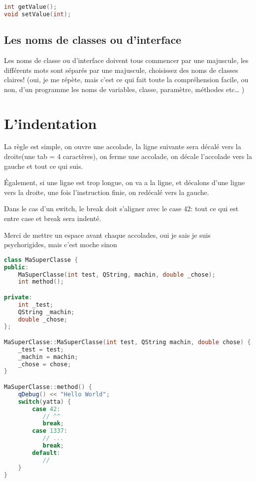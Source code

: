 \begin{lstlisting}[language=C++]
int getValue(); 
void setValue(int);
\end{lstlisting}

\subsection{Les noms de classes ou d'interface}\label{les-noms-de-classes-ou-dinterface}

Les noms de classe ou d'interface doivent tous commencer par une
majuscule, les différents mots sont séparés par une majuscule,
choisissez des noms de classes claires! (oui, je me répète, mais c'est
ce qui fait toute la compréhension facile, ou non, d'un programme les
noms de variables, classe, paramètre, méthodes etc\ldots{} )

\section{L'indentation}\label{lindentation}

La règle est simple, on ouvre une accolade, la ligne suivante sera
décalé vers la droite(une tab = 4 caractères), on ferme une accolade, on
décale l'accolade vers la gauche et tout ce qui suis.

Également, si une ligne est trop longue, on va a la ligne, et décalons
d'une ligne vers la droite, une fois l'instruction finie, on redécalé
vers la gauche.

Dans le cas d'un switch, le break doit s'aligner avec le case 42: tout
ce qui est entre case et break sera indenté.

Merci de mettre un espace avant chaque accolades, oui je sais je suis
psychorigides, mais c'est moche sinon

\begin{lstlisting}[language=C++]
class MaSuperClasse { 
public: 
	MaSuperClasse(int test, QString, machin, double _chose);
	int method();

private: 
	int _test;
	QString _machin;
	double _chose;
};

MaSuperClasse::MaSuperClasse(int test, QString machin, double chose) {
	_test = test;
	_machin = machin; 
	_chose = chose; 
}

MaSuperClasse::method() {
	qDebug() << "Hello World";
	switch(yatta) {
		case 42:
		   // ^^
		   break;
		case 1337:
		   // ...
		   break;
		default: 
		   //
	}
}
\end{lstlisting}

